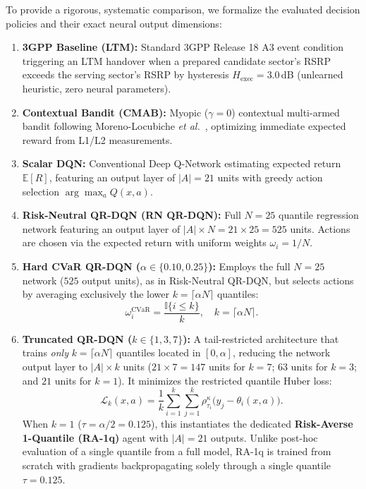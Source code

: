 \documentclass{ieeetmlcn}
\begin{document}
To provide a rigorous, systematic comparison, we formalize the evaluated decision policies and their exact neural output dimensions:
\begin{enumerate}\setlength\itemsep{0.5pt}\setlength\parskip{0pt}
    \item \textbf{3GPP Baseline (LTM):} Standard 3GPP Release 18 A3 event condition triggering an LTM handover when a prepared candidate sector's RSRP exceeds the serving sector's RSRP by hysteresis $H_{\text{exec}} = 3.0$\,dB (unlearned heuristic, zero neural parameters).
    \item \textbf{Contextual Bandit (CMAB):} Myopic ($\gamma = 0$) contextual multi-armed bandit following Moreno-Locubiche \textit{et al.}~\cite{cmab_ho}, optimizing immediate expected reward from L1/L2 measurements.
    \item \textbf{Scalar DQN:} Conventional Deep Q-Network estimating expected return $\mathbb{E}[R]$, featuring an output layer of $|A| = 21$ units with greedy action selection $\arg\max_a Q(x,a)$.
    \item \textbf{Risk-Neutral QR-DQN (RN QR-DQN):} Full $N=25$ quantile regression network featuring an output layer of $|A| \times N = 21 \times 25 = 525$ units. Actions are chosen via the expected return with uniform weights $\omega_i = 1/N$.
    \item \textbf{Hard CVaR QR-DQN ($\alpha \in \{0.10, 0.25\}$):} Employs the full $N=25$ network ($525$ output units), as in Risk-Neutral QR-DQN, but selects actions by averaging exclusively the lower $k = \lceil\alpha N\rceil$ quantiles:
    \begin{equation}
    \omega_i^{\mathrm{CVaR}} = \frac{\mathbb{I}\{i\le k\}}{k}, \quad k = \lceil\alpha N\rceil.
    \label{eq:cvar}
    \end{equation}
    \item \textbf{Truncated QR-DQN ($k \in \{1, 3, 7\}$):} A tail-restricted architecture that trains \emph{only} $k = \lceil\alpha N\rceil$ quantiles located in $[0, \alpha]$, reducing the network output layer to $|A| \times k$ units ($21 \times 7 = 147$ units for $k=7$; $63$ units for $k=3$; and $21$ units for $k=1$). It minimizes the restricted quantile Huber loss:
    \begin{equation}
    \mathcal{L}_k(x,a) = \frac{1}{k}\sum_{i=1}^{k}\sum_{j=1}^{k} \rho^{\kappa}_{\tau_i}\!\big(y_j - \theta_i(x,a)\big).
    \label{eq:qr-lossk}
    \end{equation}
    When $k=1$ ($\tau = \alpha/2 = 0.125$), this instantiates the dedicated \textbf{Risk-Averse 1-Quantile (RA-1q)} agent with $|A| = 21$ outputs. Unlike post-hoc evaluation of a single quantile from a full model, RA-1q is trained from scratch with gradients backpropagating solely through a single quantile  $\tau=0.125$.

\end{enumerate}
\end{document}
